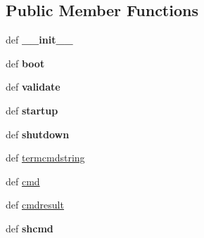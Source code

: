 \subsection*{Public Member Functions}
\begin{DoxyCompactItemize}
\item 
\hypertarget{classcore_1_1phys_1_1pnodes_1_1_physical_node_a732505a33a01eb5da8aac4a8a2f26888}{def {\bfseries \+\_\+\+\_\+init\+\_\+\+\_\+}}\label{classcore_1_1phys_1_1pnodes_1_1_physical_node_a732505a33a01eb5da8aac4a8a2f26888}

\item 
\hypertarget{classcore_1_1phys_1_1pnodes_1_1_physical_node_a6e1c01ead27ab41ac2550fda6d630c41}{def {\bfseries boot}}\label{classcore_1_1phys_1_1pnodes_1_1_physical_node_a6e1c01ead27ab41ac2550fda6d630c41}

\item 
\hypertarget{classcore_1_1phys_1_1pnodes_1_1_physical_node_a903b878f9e477f607ad3c02749d40bf5}{def {\bfseries validate}}\label{classcore_1_1phys_1_1pnodes_1_1_physical_node_a903b878f9e477f607ad3c02749d40bf5}

\item 
\hypertarget{classcore_1_1phys_1_1pnodes_1_1_physical_node_ac38313bbc9c2c29f40c2215c009566e6}{def {\bfseries startup}}\label{classcore_1_1phys_1_1pnodes_1_1_physical_node_ac38313bbc9c2c29f40c2215c009566e6}

\item 
\hypertarget{classcore_1_1phys_1_1pnodes_1_1_physical_node_a32398110ba4972af58bf026a3bde1582}{def {\bfseries shutdown}}\label{classcore_1_1phys_1_1pnodes_1_1_physical_node_a32398110ba4972af58bf026a3bde1582}

\item 
def \hyperlink{classcore_1_1phys_1_1pnodes_1_1_physical_node_afce37397fbff19aef0f53a30ae851d1e}{termcmdstring}
\item 
def \hyperlink{classcore_1_1phys_1_1pnodes_1_1_physical_node_a5a7993ae151bb65c4ed44c5f5cd4390d}{cmd}
\item 
def \hyperlink{classcore_1_1phys_1_1pnodes_1_1_physical_node_aced9043f89742f848096b6258fd43037}{cmdresult}
\item 
\hypertarget{classcore_1_1phys_1_1pnodes_1_1_physical_node_a162326c6793de852d4590652ac006e20}{def {\bfseries shcmd}}\label{classcore_1_1phys_1_1pnodes_1_1_physical_node_a162326c6793de852d4590652ac006e20}


\end{DoxyCompactItemize}
